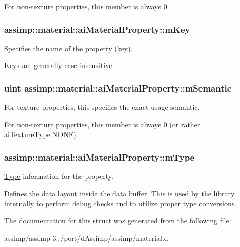 For non-\/texture properties, this member is always 0. \hypertarget{structassimp_1_1material_1_1ai_material_property_afe4ebd7e7adaccee8f4a5322aeb59757}{
\subsubsection[{m\+Key}]{ assimp\+::material\+::ai\+Material\+Property\+::m\+Key}}\label{structassimp_1_1material_1_1ai_material_property_afe4ebd7e7adaccee8f4a5322aeb59757}
Specifies the name of the property (key).

Keys are generally case insensitive. \hypertarget{structassimp_1_1material_1_1ai_material_property_a12b6a483209cee22013648d1a4388259}{
\subsubsection[{m\+Semantic}]{\setlength{\rightskip}{0pt plus 5cm}uint assimp\+::material\+::ai\+Material\+Property\+::m\+Semantic}}\label{structassimp_1_1material_1_1ai_material_property_a12b6a483209cee22013648d1a4388259}
For texture properties, this specifies the exact usage semantic.

For non-\/texture properties, this member is always 0 (or rather {\ttfamily ai\+Texture\+Type.\+N\+O\+N\+E}). \hypertarget{structassimp_1_1material_1_1ai_material_property_a50ea7cf49a1560abff974c8838acadb4}{
\subsubsection[{m\+Type}]{ assimp\+::material\+::ai\+Material\+Property\+::m\+Type}}\label{structassimp_1_1material_1_1ai_material_property_a50ea7cf49a1560abff974c8838acadb4}
\hyperlink{struct_type}{Type} information for the property.

Defines the data layout inside the data buffer. This is used by the library internally to perform debug checks and to utilize proper type conversions. 

The documentation for this struct was generated from the following file\+:\begin{DoxyCompactItemize}
\item 
assimp/assimp-\/3../port/d\+Assimp/assimp/material.\+d\end{DoxyCompactItemize}

